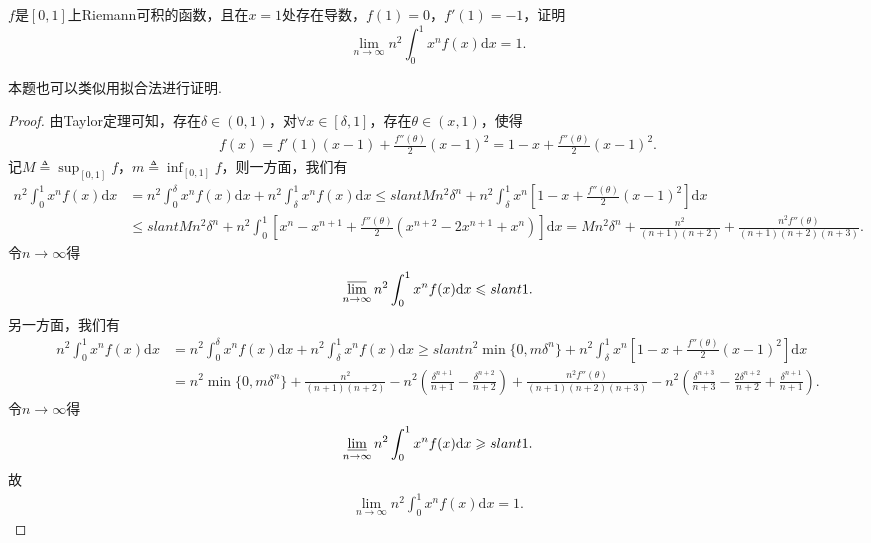\documentclass[../../main.tex]{subfiles}
\begin{document}
\begin{example}
$f$是$[0,1]$上Riemann可积的函数，且在$x=1$处存在导数，$f(1)=0$，$f'(1)=-1$，证明$$\lim\limits_{n \to \infty} n^2 \int_0^1 x^n f(x) \mathrm{d}x = 1.$$
\end{example}
\begin{note}
本题也可以类似用拟合法进行证明.
\end{note}
\begin{proof}
由Taylor定理可知，存在$\delta \in (0,1)$，对$\forall x\in [\delta,1]$，存在$\theta \in (x,1)$，使得
\begin{align*}
f(x) = f'(1)(x-1) + \frac{f''(\theta)}{2}(x-1)^2 = 1 - x + \frac{f''(\theta)}{2}(x-1)^2.
\end{align*}
记$M \triangleq \sup_{[0,1]}f$，$m \triangleq \inf_{[0,1]}f$，则一方面，我们有
\begin{align*}
n^2\int_0^1 x^n f(x) \mathrm{d}x &= n^2\int_0^\delta x^n f(x) \mathrm{d}x + n^2\int_\delta^1 x^n f(x) \mathrm{d}x \leqslant slant Mn^2\delta^n + n^2\int_\delta^1 x^n \left[1 - x + \frac{f''(\theta)}{2}(x - 1)^2\right] \mathrm{d}x \\
&\leqslant slant Mn^2\delta^n + n^2\int_0^1 \left[x^n - x^{n+1} + \frac{f''(\theta)}{2}(x^{n+2} - 2x^{n+1} + x^n)\right] \mathrm{d}x = Mn^2\delta^n + \frac{n^2}{(n+1)(n+2)} + \frac{n^2 f''(\theta)}{(n+1)(n+2)(n+3)}.
\end{align*}
令$n \to \infty$得
\begin{align*}
\varlimsup_{n \to \infty} n^2\int_0^1 x^n f(x) \mathrm{d}x \leqslant slant 1.
\end{align*}
另一方面，我们有
\begin{align*}
n^2\int_0^1 x^n f(x) \mathrm{d}x &= n^2\int_0^\delta x^n f(x) \mathrm{d}x + n^2\int_\delta^1 x^n f(x) \mathrm{d}x \geqslant slant n^2\min\{0, m\delta^n\} + n^2\int_\delta^1 x^n \left[1 - x + \frac{f''(\theta)}{2}(x - 1)^2\right] \mathrm{d}x \\
&= n^2\min\{0, m\delta^n\} + \frac{n^2}{(n+1)(n+2)} - n^2\left(\frac{\delta^{n+1}}{n+1} - \frac{\delta^{n+2}}{n+2}\right) + \frac{n^2 f''(\theta)}{(n+1)(n+2)(n+3)} - n^2\left(\frac{\delta^{n+3}}{n+3} - \frac{2\delta^{n+2}}{n+2} + \frac{\delta^{n+1}}{n+1}\right).
\end{align*}
令$n \to \infty$得
\begin{align*}
\varliminf_{n \to \infty} n^2\int_0^1 x^n f(x) \mathrm{d}x \geqslant slant 1.
\end{align*}
故
\begin{align*}
\lim_{n \to \infty} n^2\int_0^1 x^n f(x) \mathrm{d}x = 1.
\end{align*}
\end{proof}
\end{document}
